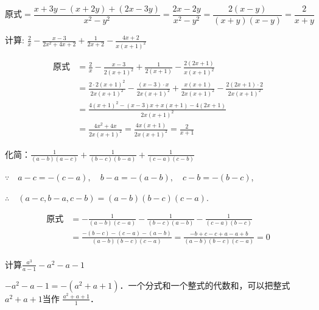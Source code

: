 \begin{solution}
    \[
        \text{原式}=\frac{x+3y-(x+2y)+(2x-3y)}{x^2-y^2}=\frac{2x-2y}{x^2-y^2}=\frac{2(x-y)}{(x+y)(x-y)}=\frac{2}{x+y}
    \]
\end{solution}


\begin{example}
    计算:
$\frac{2}{x}-\frac{x-3}{2 x^{2}+4 x+2}+\frac{1}{2 x+2}-\frac{4 x+2}{x(x+1)^{2}}$
\end{example}

\begin{solution}
\[\begin{split}
    \text{原式}&= \frac{2}{x}-\frac{x-3}{2(x+1)^{2}}+\frac{1}{2(x+1)}-\frac{2(2 x+1)}{x(x+1)^{2}} \\
    &= \frac{2 \cdot 2(x+1)^{2}}{2 x(x+1)^{2}}-\frac{(x-3) \cdot x}{2 x(x+1)^{2}}+\frac{x(x+1)}{2 x(x+1)^{2}}-\frac{2(2 x+1) \cdot 2}{2 x(x+1)^{2}} \\
    &=\frac{4(x+1)^{2}-(x-3) x+x(x+1)-4(2 x+1)}{2 x(x+1)^{2}}\\
&=\frac{4 x^{2}+4 x}{2 x(x+1)^{2}}=\frac{4 x(x+1)}{2 x(x+1)^{2}}=\frac{2}{x+1}
\end{split}\]
\end{solution}

\begin{example}
    化简：$\frac{1}{(a-b)(a-c)}+\frac{1}{(b-c)(b-a)}+\frac{1}{(c-a)(c-b)}$
    \end{example}

\begin{analyze}
    $\because \quad a-c=-(c-a),\quad  b-a=-(a-b),\quad c-b=-(b-c)$,

    $\therefore\quad (a-c,b-a,c-b)=(a-b)(b-c)(c-a)$.
\end{analyze}

\begin{solution}
   \[\begin{split}
    \text{原式}&=-\frac{1}{(a-b)(c-a)}-\frac{1}{(b-c)(a-b)}-\frac{1}{(c-a)(b-c)}\\
    &=\frac{-(b-c)-(c-a)-(a-b)}{(a-b)(b-c)(c-a)}
    =\frac{-b+c-c+a-a+b}{(a-b)(b-c)(c-a)}
    =0\\
   \end{split}\] 
\end{solution}

\begin{example}
    计算$\frac{a^3}{a-1}-a^2-a-1$
\end{example}

\begin{analyze}
    $-a^2-a-1=-(a^2+a+1)$．一个分式和一个整式的代数和，可以把整式$a^2+a+1$当作
    $\frac{a^2+a+1}{1}$．
\end{analyze}

